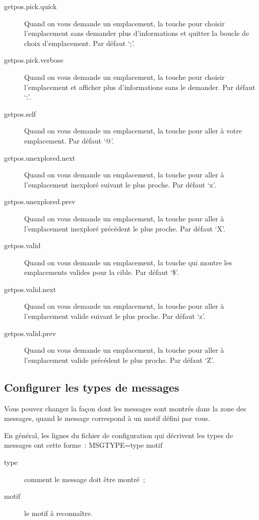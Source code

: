 \documentclass[titlepage]{article}
\begin{document}
\begin{description}
\item[{getpos.pick.quick}]
Quand on vous demande un emplacement, la touche pour choisir l'emplacement
sans demander plus d'informations et quitter la boucle de choix
d'emplacement.
Par défaut `;'.

\item[{getpos.pick.verbose}]
Quand on vous demande un emplacement, la touche pour choisir l'emplacement
et afficher plus d'informations sans le demander.
Par défaut `:'.

\item[{getpos.self}]
Quand on vous demande un emplacement, la touche pour aller à votre
emplacement.
Par défaut `@'.

\item[{getpos.unexplored.next}]
Quand on vous demande un emplacement, la touche pour aller à l'emplacement
inexploré suivant le plus proche.
Par défaut `x'.

\item[{getpos.unexplored.prev}]
Quand on vous demande un emplacement, la touche pour aller à l'emplacement
inexploré précédent le plus proche.
Par défaut `X'.

\item[{getpos.valid}]
Quand on vous demande un emplacement, la touche qui montre les
emplacements valides pour la cible.
Par défaut `\$'.

\item[{getpos.valid.next}]
Quand on vous demande un emplacement, la touche pour aller à l'emplacement
valide suivant le plus proche.
Par défaut `z'.

\item[{getpos.valid.prev}]
Quand on vous demande un emplacement, la touche pour aller à l'emplacement
valide précédent le plus proche.
Par défaut `Z'.

\end{description}
\subsection{Configurer les types de messages}



Vous pouvez changer la façon dont les messages sont montrés dans la zone
des messages, quand le message correspond à un motif défini par vous.


En général, les lignes du fichier de configuration qui décrivent les types
de messages ont cette forme~:
MSGTYPE=type \textquotedbl{}motif\textquotedbl{}
\begin{description}
\item[{type}]
comment le message doit être montré~;
\item[{motif}]
le motif à reconnaître.
\end{description}
\end{document}
